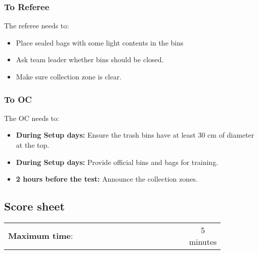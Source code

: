 \subsubsection*{To Referee}

The referee needs to:
\begin{itemize}
	\item Place sealed bags with some light contents in the bins
	\item Ask team leader whether bins should be closed.
	\item Make sure collection zone is clear.
\end{itemize}

\subsubsection*{To OC}
The OC needs to:
\begin{itemize}[nosep]
	\item \textbf{During Setup days:} Ensure the trash bins have at least 30 cm of diameter at the top.
	\item \textbf{During Setup days:} Provide official bins and bags for training.
	\item \textbf{2 hours before the test:} Announce the collection zones.
\end{itemize}

\subsection*{Score sheet}
\begin{table}[h]
	\begin{tabular}{m{0.85\linewidth} c}
		\textbf{Maximum time}: & 5 minutes \\
	\end{tabular}
\end{table}

\small\begin{scorelist}
	
\end{scorelist}

\clearpage

